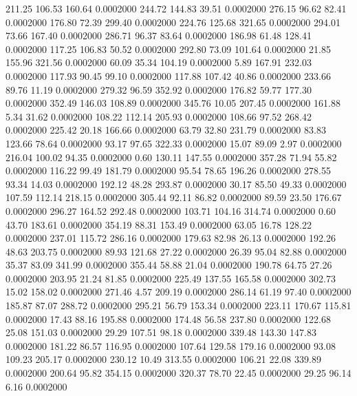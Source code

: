  211.25  106.53  160.64   0.0002000
 244.72  144.83   39.51   0.0002000
 276.15   96.62   82.41   0.0002000
 176.80   72.39  299.40   0.0002000
 224.76  125.68  321.65   0.0002000
 294.01   73.66  167.40   0.0002000
 286.71   96.37   83.64   0.0002000
 186.98   61.48  128.41   0.0002000
 117.25  106.83   50.52   0.0002000
 292.80   73.09  101.64   0.0002000
  21.85  155.96  321.56   0.0002000
  60.09   35.34  104.19   0.0002000
   5.89  167.91  232.03   0.0002000
 117.93   90.45   99.10   0.0002000
 117.88  107.42   40.86   0.0002000
 233.66   89.76   11.19   0.0002000
 279.32   96.59  352.92   0.0002000
 176.82   59.77  177.30   0.0002000
 352.49  146.03  108.89   0.0002000
 345.76   10.05  207.45   0.0002000
 161.88    5.34   31.62   0.0002000
 108.22  112.14  205.93   0.0002000
 108.66   97.52  268.42   0.0002000
 225.42   20.18  166.66   0.0002000
  63.79   32.80  231.79   0.0002000
  83.83  123.66   78.64   0.0002000
  93.17   97.65  322.33   0.0002000
  15.07   89.09    2.97   0.0002000
 216.04  100.02   94.35   0.0002000
   0.60  130.11  147.55   0.0002000
 357.28   71.94   55.82   0.0002000
 116.22   99.49  181.79   0.0002000
  95.54   78.65  196.26   0.0002000
 278.55   93.34   14.03   0.0002000
 192.12   48.28  293.87   0.0002000
  30.17   85.50   49.33   0.0002000
 107.59  112.14  218.15   0.0002000
 305.44   92.11   86.82   0.0002000
  89.59   23.50  176.67   0.0002000
 296.27  164.52  292.48   0.0002000
 103.71  104.16  314.74   0.0002000
   0.60   43.70  183.61   0.0002000
 354.19   88.31  153.49   0.0002000
  63.05   16.78  128.22   0.0002000
 237.01  115.72  286.16   0.0002000
 179.63   82.98   26.13   0.0002000
 192.26   48.63  203.75   0.0002000
  89.93  121.68   27.22   0.0002000
  26.39   95.04   82.88   0.0002000
  35.37   83.09  341.99   0.0002000
 355.44   58.88   21.04   0.0002000
 190.78   64.75   27.26   0.0002000
 203.95   21.24   81.85   0.0002000
 225.49  137.55  165.58   0.0002000
 302.73   15.02  158.02   0.0002000
 271.46    4.57  209.19   0.0002000
 286.14   61.19   97.40   0.0002000
 185.87   87.07  288.72   0.0002000
 295.21   56.79  153.34   0.0002000
 223.11  170.67  115.81   0.0002000
  17.43   88.16  195.88   0.0002000
 174.48   56.58  237.80   0.0002000
 122.68   25.08  151.03   0.0002000
  29.29  107.51   98.18   0.0002000
 339.48  143.30  147.83   0.0002000
 181.22   86.57  116.95   0.0002000
 107.64  129.58  179.16   0.0002000
  93.08  109.23  205.17   0.0002000
 230.12   10.49  313.55   0.0002000
 106.21   22.08  339.89   0.0002000
 200.64   95.82  354.15   0.0002000
 320.37   78.70   22.45   0.0002000
  29.25   96.14    6.16   0.0002000
